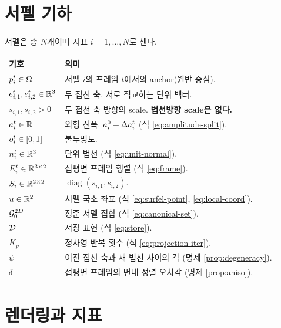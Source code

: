 \section{서펠 기하}

서펠은 총 $N$개이며 지표 $i=1,\dots,N$로 센다.

\begin{longtable}{@{}lp{10.2cm}@{}}
\toprule
기호 & 의미 \\
\midrule
\endhead
$p^t_i \in \Omega$ & 서펠 $i$의 프레임 $t$에서의 anchor(원반 중심). \\
$e^t_{i,1}, e^t_{i,2} \in \mathbb{R}^3$ & 두 접선 축. 서로 직교하는 단위 벡터. \\
$s_{i,1}, s_{i,2} > 0$ & 두 접선 축 방향의 scale. \textbf{법선방향 scale은 없다.} \\
$a^t_i \in \mathbb{R}$ & 외형 진폭. $a^0_i + \Delta a^t_i$ (식 \eqref{eq:amplitude-split}). \\
$o^t_i \in [0,1]$ & 불투명도. \\
$n^t_i \in \mathbb{R}^3$ & 단위 법선 (식 \eqref{eq:unit-normal}). \\
$E^t_i \in \mathbb{R}^{3\times2}$ & 접평면 프레임 행렬 (식 \eqref{eq:frame}). \\
$S_i \in \mathbb{R}^{2\times2}$ & $\operatorname{diag}(s_{i,1},s_{i,2})$. \\
$u \in \mathbb{R}^2$ & 서펠 국소 좌표 (식 \eqref{eq:surfel-point}, \eqref{eq:local-coord}). \\
$\mathcal{G}^{2D}_0$ & 정준 서펠 집합 (식 \eqref{eq:canonical-set}). \\
$\mathcal{D}$ & 저장 표현 (식 \eqref{eq:store}). \\
$K_p$ & 정사영 반복 횟수 (식 \eqref{eq:projection-iter}). \\
$\psi$ & 이전 접선 축과 새 법선 사이의 각 (명제 \ref{prop:degeneracy}). \\
$\delta$ & 접평면 프레임의 면내 정렬 오차각 (명제 \ref{prop:aniso}). \\
\bottomrule
\end{longtable}

\section{렌더링과 지표}

